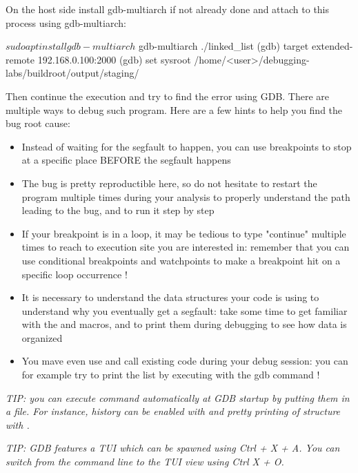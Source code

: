 
On the host side install gdb-multiarch if not already done and attach to this
process using gdb-multiarch:

\begin{bashinput}
$ sudo apt install gdb-multiarch
$ gdb-multiarch ./linked_list
(gdb) target extended-remote 192.168.0.100:2000
(gdb) set sysroot /home/<user>/debugging-labs/buildroot/output/staging/
\end{bashinput}

Then continue the execution and try to find the error using GDB. There are
multiple ways to debug such program. Here are a few hints to help you find the bug root
cause:
\begin{itemize}
  \item Instead of waiting for the segfault to happen, you can use breakpoints
  to stop at a specific place BEFORE the segfault happens
  \item The bug is pretty reproductible here, so do not hesitate to restart the
  program multiple times during your analysis to properly understand the path
  leading to the bug, and to run it step by step
  \item If your breakpoint is in a loop, it may be tedious to type "continue"
  multiple times to reach to execution site you are interested in: remember
  that you can use conditional breakpoints and watchpoints to make a breakpoint
  hit on a specific loop occurrence !
  \item It is necessary to understand the data structures your code is using to
  understand why you eventually get a segfault: take some time to get familiar
  with the  and  macros, and to print them
  during debugging to see how data is organized
  \item You mave even use and call existing code during your debug session: you
  can for example try to print the list by executing
   with the  gdb command !
\end{itemize}

{\em TIP: you can execute command automatically at GDB startup by putting them
in a  file. For instance, history can be enabled with
 and pretty printing of structure with
.}

{\em TIP: GDB features a TUI which can be spawned using Ctrl + X + A. You can
switch from the command line to the TUI view using Ctrl X + O.}

